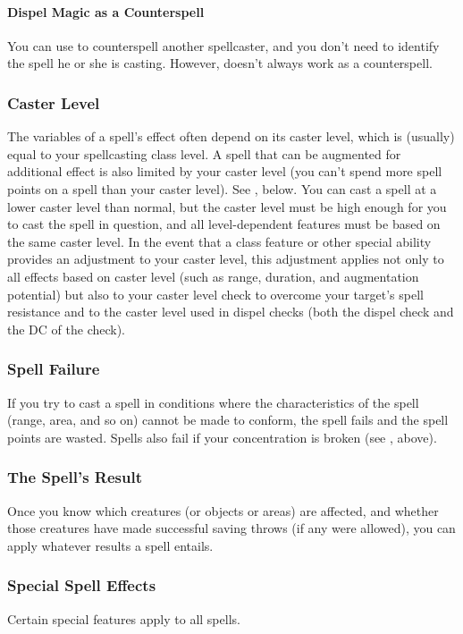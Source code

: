 \paragraph{Dispel Magic as a Counterspell}
You can use  to counterspell another spellcaster, and you don't need to identify the spell he or she is casting. 
However,  doesn't always work as a counterspell.

\subsubsection{Caster Level}
The variables of a spell's effect often depend on its caster level, which is (usually) equal to your spellcasting class level. 
A spell that can be augmented for additional effect is also limited by your caster level (you can't spend more spell points on a spell than your caster level). 
See , below.
You can cast a spell at a lower caster level than normal, but the caster level must be high enough for you to cast the spell in question, and all level-dependent features must be based on the same caster level.
In the event that a class feature or other special ability provides an adjustment to your caster level, this adjustment applies not only to all effects based on caster level (such as range, duration, and augmentation potential) but also to your caster level check to overcome your target's spell resistance and to the caster level used in dispel checks (both the dispel check and the DC of the check).

\subsubsection{Spell Failure}
If you try to cast a spell in conditions where the characteristics of the spell (range, area, and so on) cannot be made to conform, the spell fails and the spell points are wasted. 
Spells also fail if your concentration is broken (see , above).

\subsubsection{The Spell's Result}
Once you know which creatures (or objects or areas) are affected, and whether those creatures have made successful saving throws (if any were allowed), you can apply whatever results a spell entails.

\subsubsection{Special Spell Effects}
Certain special features apply to all spells.

